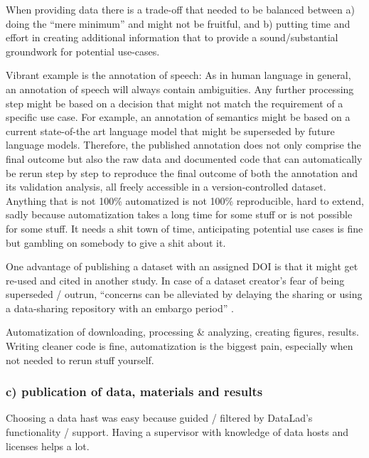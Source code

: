 When providing data there is a trade-off that needed to be balanced between a)
doing the ``mere minimum'' and  might not be fruitful, and b) putting time and
effort in creating additional information that to provide a sound/substantial
groundwork for potential use-cases.

%
Vibrant example is the annotation of speech:
%
As in human language in general, an annotation of speech will always contain
ambiguities.
%
Any further processing step might be based on a decision that might not match
the requirement of a specific use case.
%
For example, an annotation of semantics might be based on a current state-of-the
art language model that might be superseded by future language models.
%
Therefore, the published annotation does not only comprise the final outcome but
also the raw data and documented code that can automatically be rerun step by
step to reproduce the final outcome of both the annotation and its validation
analysis, all freely accessible in a version-controlled dataset.
%
Anything that is not 100\% automatized is not 100\% reproducible, hard to
extend, sadly because automatization takes a long time for some stuff or is not
possible for some stuff.
%
It needs a shit town of time, anticipating potential use cases is fine but
gambling on somebody to give a shit about it.

%
One advantage of publishing a dataset with an assigned DOI is that it might get
re-used and cited in another study.
%
In case of a dataset creator's fear of being superseded / outrun, ``concerns can
be alleviated by delaying the sharing or using a data-sharing repository with an
embargo period'' \citep{nichols2017best}.

%
Automatization of downloading, processing \& analyzing, creating figures,
results.
%
Writing cleaner code is fine, automatization is the biggest pain, especially
when not needed to rerun stuff yourself.


\subsubsection{c) publication of data, materials and results}




%
Choosing a data hast was easy because guided / filtered by DataLad's
functionality / support.
%
Having a supervisor with knowledge of data hosts and licenses helps a lot.




